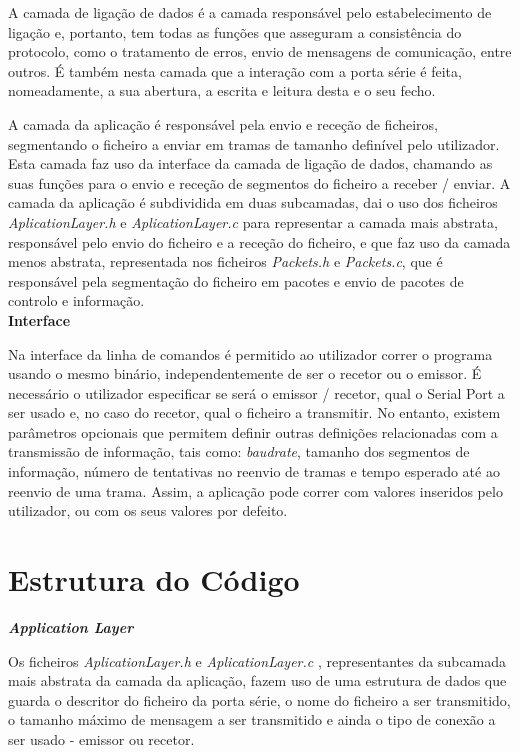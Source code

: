 \documentclass[a4paper, 11pt]{article}
\begin{document}
A camada de ligação de dados é a camada responsável pelo estabelecimento de ligação e, portanto, tem todas as funções que asseguram a consistência do protocolo, como o tratamento de erros, envio de mensagens de comunicação, entre outros. É também nesta camada que a interação com a porta série é feita, nomeadamente, a sua abertura, a escrita e leitura desta e o seu fecho.

A camada da aplicação é responsável pela envio e receção de ficheiros, segmentando o ficheiro a enviar em tramas de tamanho definível pelo utilizador. Esta camada faz uso da interface da camada de ligação de dados, chamando as suas funções para o envio e receção de segmentos do ficheiro a receber / enviar. A camada da aplicação é subdividida em duas subcamadas, dai o uso dos ficheiros \textit{AplicationLayer.h} e \textit{AplicationLayer.c} para representar a camada mais abstrata, responsável pelo envio do ficheiro e a receção do ficheiro, e que faz uso da camada menos abstrata, representada nos ficheiros  \textit{Packets.h} e \textit{Packets.c}, que é responsável pela segmentação do ficheiro em pacotes e envio de pacotes de controlo e informação.\\

\large\textbf{Interface}\\
\normalsize

Na interface da linha de comandos é permitido ao utilizador correr o programa usando o mesmo binário, independentemente de ser o recetor ou o emissor.
É necessário o utilizador especificar se será o emissor / recetor, qual o Serial Port a ser usado e, no caso do recetor, qual o ficheiro a transmitir. No entanto, existem parâmetros opcionais que permitem definir outras definições relacionadas com a transmissão de informação, tais como: \textit{baudrate}, tamanho dos segmentos de informação, número de tentativas no reenvio de tramas e tempo esperado até ao reenvio de uma trama.
Assim, a aplicação pode correr com valores inseridos pelo utilizador, ou com os seus valores por defeito.

\section{Estrutura do Código}

\large\textbf{\textit{Application Layer}}\\
\normalsize

Os ficheiros \textit{AplicationLayer.h} e \textit{AplicationLayer.c} , representantes da subcamada mais abstrata da camada da aplicação, fazem uso de uma estrutura de dados que guarda o descritor do ficheiro da porta série, o nome do ficheiro a ser transmitido, o tamanho máximo de mensagem a ser transmitido e ainda o tipo de conexão a ser usado - emissor ou recetor.
\end{document}
